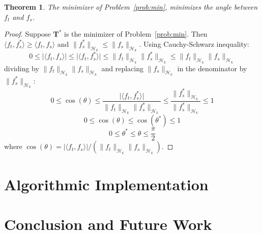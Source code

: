 \documentclass[conference]{IEEEtran}
\newtheorem{theorem}{Theorem}
\newcommand{\Hcal}{\mathcal{H}}
\begin{document}
\begin{theorem}
	The minimizer of Problem~\ref{prob:min}, minimizes the angle between $f_t$ and $f_s$.
\end{theorem}
\begin{proof}
	Suppose $\mathbf{T}^*$ is the minimizer of Problem~\ref{prob:min}. Then $\langle f_t, f_s^* \rangle \geq \langle f_t, f_s \rangle$ and $\lVert f_s^* \rVert_{\Hcal_k} \leq \lVert f_s \rVert_{\Hcal_k}$. Using Cauchy-Schwarz inequality:
    \begin{equation}
    	\nonumber 0 \leq \lvert \langle f_t, f_s \rangle \rvert \leq \lvert \langle f_t, f_s^* \rangle \rvert \leq \lVert f_t \rVert_{\Hcal_k} \lVert f_s^* \rVert_{\Hcal_k} \leq \lVert f_t \rVert_{\Hcal_k} \lVert f_s \rVert_{\Hcal_k}
    \end{equation}
    dividing by $\lVert f_t \rVert_{\Hcal_k} \lVert f_s \rVert_{\Hcal_k}$ and replacing $\lVert f_s \rVert_{\Hcal_k}$ in the denominator by $\lVert f_s^* \rVert_{\Hcal_k}$:
    \begin{equation}
    	\nonumber 0 \leq \cos(\theta) \leq \frac{\lvert \langle f_t, f_s^* \rangle \rvert}{\lVert f_t \rVert_{\Hcal_k} \lVert f_s^* \rVert_{\Hcal_k}} \leq \frac{\lVert f_s^*\rVert_{\Hcal_k}}{\lVert f_s^* \rVert_{\Hcal_k}} \leq 1
    \end{equation} 
    \begin{equation}
    	\nonumber 0 \leq \cos(\theta) \leq \cos(\theta^*) \leq 1
    \end{equation}
    \begin{equation}
    	\nonumber 0 \leq \theta^* \leq \theta \leq \frac{\pi}{2}
    \end{equation}
where $\cos(\theta) = \lvert \langle f_t, f_s \rangle \rvert / (\lVert f_t \rVert_{\Hcal_k} \lVert f_s \rVert_{\Hcal_k})$.
\end{proof}


\section{Algorithmic Implementation}
\label{sec:alg}


\section{Conclusion and Future Work} 
\label{sec:conclusion}





\small


\end{document}
